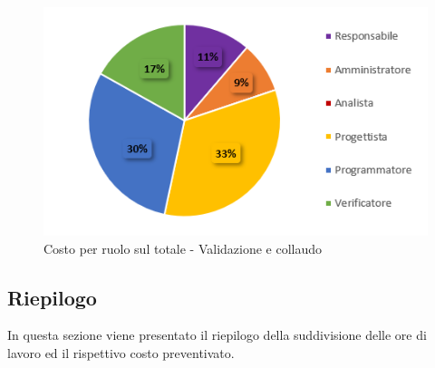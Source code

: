      \begin{figure}[H]
       \centering
        \includegraphics[scale=0.8]{immagini/costo_ruolo_validazione.png}
        \caption{Costo per ruolo sul totale - Validazione e collaudo}
      \end{figure}
   
\subsection{Riepilogo} \label{subsection:preventivo_riepilogo}
In questa sezione viene presentato il riepilogo della suddivisione delle ore di lavoro ed il rispettivo costo preventivato.


